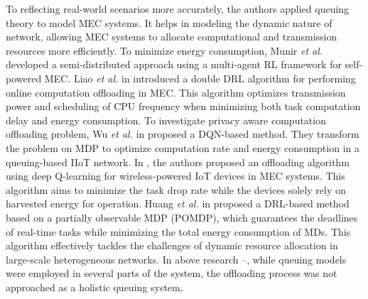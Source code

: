 \documentclass[10pt, journal,letterpaper]{IEEEtran}
\begin{document}
 To reflecting real-world scenarios more accurately, the authors applied queuing theory to model MEC systems. It helps in modeling the dynamic nature of network, allowing MEC systems to allocate computational and transmission resources more efficiently.
 	To minimize energy consumption, Munir \textit{et al.} \cite{munir2021multi} developed a semi-distributed approach using a multi-agent RL framework for self-powered MEC. 
 	Liao \textit{et al.} in \cite{liao2023online} introduced a double DRL algorithm for performing online computation offloading in MEC. This algorithm optimizes transmission power and scheduling of CPU frequency when minimizing both task computation delay and energy consumption. 
To investigate privacy aware computation offloading problem, Wu \textit{et al.} in \cite{wu2024combining} proposed a DQN-based method. They transform the problem on MDP to optimize computation rate and energy consumption in a queuing-based IIoT network.
	In \cite{Bolourian-WCL24}, the authors proposed an offloading algorithm using deep Q-learning for wireless-powered IoT devices in MEC systems. This algorithm aims to minimize the task drop rate while the devices solely rely on harvested energy for operation. 
	 Huang \textit{et al.} in \cite{huang2021deadline} proposed a DRL-based method based on a partially observable MDP (POMDP), which guarantees the deadlines of real-time tasks while minimizing the total energy consumption of MDs. This algorithm effectively tackles the challenges of dynamic resource allocation in large-scale heterogeneous networks.
	 In above research \cite{munir2021multi}--\cite{huang2021deadline}, while queuing models were employed in several parts of the system, the offloading process was not approached as a holistic queuing system. 
	 

	 
\end{document}
